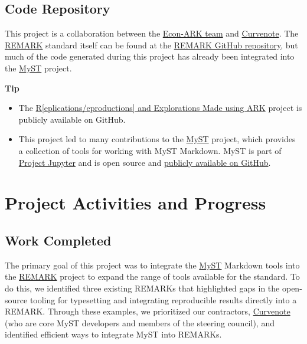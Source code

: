 \documentclass{article}
\begin{document}
\subsection{Code Repository}


This project is a collaboration between the \href{https://econ-ark.org/team}{Econ-ARK team} and \href{https://curvenote.com}{Curvenote}. The \href{https://github.com/econ-ark/REMARK}{REMARK} standard itself can be found at the \href{https://github.com/econ-ark/REMARK}{REMARK GitHub repository}, but much of the code generated during this project has already been integrated into the \href{https://myst-parser.readthedocs.io/en/v0.16.0/}{MyST} project.

\begin{framed}
\textbf{Tip}\\
\begin{itemize}
\item The \href{https://github.com/econ-ark/REMARK}{R[eplications/eproductions] and Explorations Made using ARK} project is publicly available on GitHub.
\item This project led to many contributions to the \href{https://mystmd.org/}{MyST} project, which provides a collection of tools for working with MyST Markdown. MyST is part of \href{https://jupyter.org}{Project Jupyter} and is open source and \href{https://github.com/jupyter-book/mystmd}{publicly available on GitHub}.
\end{itemize}
\end{framed}

\section{Project Activities and Progress}

\subsection{Work Completed}


The primary goal of this project was to integrate the \href{https://github.com/jupyter-book/mystmd}{MyST} Markdown tools into the \href{https://github.com/econ-ark/REMARK}{REMARK} project to expand the range of tools available for the standard. To do this, we identified three existing REMARKs that highlighted gaps in the open-source tooling for typesetting and integrating reproducible results directly into a REMARK. Through these examples, we prioritized our contractors, \href{https://curvenote.com}{Curvenote} (who are core MyST developers and members of the steering council), and identified efficient ways to integrate MyST into REMARKs.
\end{document}
